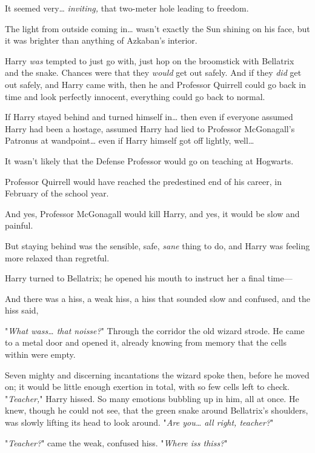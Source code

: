It seemed very{\ldots} \emph{inviting,} that two-meter hole leading to freedom.

The light from outside coming in{\ldots} wasn't exactly the Sun shining on his 
face, but it was brighter than anything of Azkaban's interior.

Harry \emph{was} tempted to just go with, just hop on the broomstick with 
Bellatrix and the snake. Chances were that they \emph{would} get out safely. 
And if they \emph{did} get out safely, and Harry came with, then he and 
Professor Quirrell could go back in time and look perfectly innocent, 
everything could go back to normal.

If Harry stayed behind and turned himself in{\ldots} then even if everyone 
assumed Harry had been a hostage, assumed Harry had lied to Professor 
McGonagall's Patronus at wandpoint{\ldots} even if Harry himself got off 
lightly, well{\ldots}

It wasn't likely that the Defense Professor would go on teaching at Hogwarts.

Professor Quirrell would have reached the predestined end of his career, in 
February of the school year.

And yes, Professor McGonagall would kill Harry, and yes, it would be slow and 
painful.

But staying behind was the sensible, safe, \emph{sane} thing to do, and Harry 
was feeling more relaxed than regretful.

Harry turned to Bellatrix; he opened his mouth to instruct her a final time---

And there was a hiss, a weak hiss, a hiss that sounded slow and confused, and 
the hiss said,

"\emph{What wass{\ldots} that noisse?}"
\sbreak
Through the corridor the old wizard strode. He came to a metal door and opened 
it, already knowing from memory that the cells within were empty.

Seven mighty and discerning incantations the wizard spoke then, before he moved 
on; it would be little enough exertion in total, with so few cells left to 
check.
\sbreak
"\emph{Teacher,}" Harry hissed. So many emotions bubbling up in him, all at 
once. He knew, though he could not see, that the green snake around Bellatrix's 
shoulders, was slowly lifting its head to look around. "\emph{Are you{\ldots} 
all right, teacher?}"

"\emph{Teacher?}" came the weak, confused hiss. "\emph{Where iss thiss?}"

